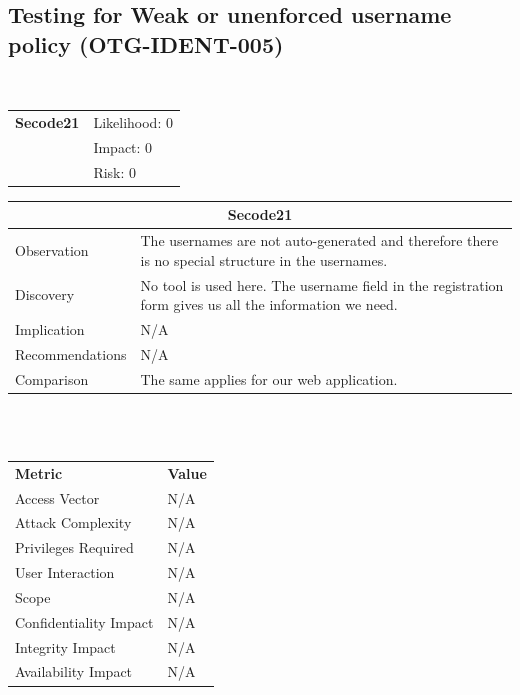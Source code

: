 \documentclass[headsepline,footsepline,footinclude=false,oneside,fontsize=11pt,paper=a4,listof=totoc,bibliography=totoc]{scrbook} %
\begin{document}
\subsection{Testing for Weak or unenforced username policy (OTG-IDENT-005)}\
\begin{tabular}{cR{12cm}}
	\textbf{Secode21} & Likelihood: 0\\& Impact: 0\\& Risk: 0
\end{tabular}

\begin{tabular}{ l|p{11cm}  }
	\hline
	\multicolumn{2}{c}{\textbf{Secode21}} \\ 
	\hline
	Observation   & The usernames are not auto-generated and therefore there is no special structure in the usernames. \\
	Discovery  & No tool is used here. The username field in the registration form gives us all the information we need. \\
	Implication    & N/A \\
	Recommendations & N/A \\
	Comparison & The same applies for our web application. \\  
	\hline
\end{tabular}
\\
\vspace{0.5cm}
\\
\begin{center}
	\begin{tabular}{ll}
		\rowcolor[HTML]{34CDF9} 
		{\color[HTML]{ECF4FF} \textbf{Metric}}        & {\color[HTML]{ECF4FF} \textbf{Value}} \\
		\rowcolor[HTML]{BBDAFF} 
		{\color[HTML]{333333} Access Vector}          & {\color[HTML]{333333} } N/A              \\
		\rowcolor[HTML]{ECF4FF} 
		{\color[HTML]{333333} Attack Complexity}      & {\color[HTML]{333333} } N/A              \\
		\rowcolor[HTML]{BBDAFF} 
		{\color[HTML]{333333} Privileges Required}    & {\color[HTML]{333333} } N/A              \\
		\rowcolor[HTML]{ECF4FF} 
		{\color[HTML]{333333} User Interaction}       & {\color[HTML]{333333} } N/A              \\
		\rowcolor[HTML]{BBDAFF} 
		{\color[HTML]{333333} Scope}                  & {\color[HTML]{333333} } N/A              \\
		\rowcolor[HTML]{ECF4FF} 
		{\color[HTML]{333333} Confidentiality Impact} & {\color[HTML]{333333} } N/A              \\
		\rowcolor[HTML]{BBDAFF} 
		{\color[HTML]{333333} Integrity Impact}       & {\color[HTML]{333333} } N/A              \\
		\rowcolor[HTML]{ECF4FF} 
		{\color[HTML]{333333} Availability Impact}    & {\color[HTML]{333333} } N/A             
	\end{tabular}
\end{center}
\pagebreak
\end{document}
